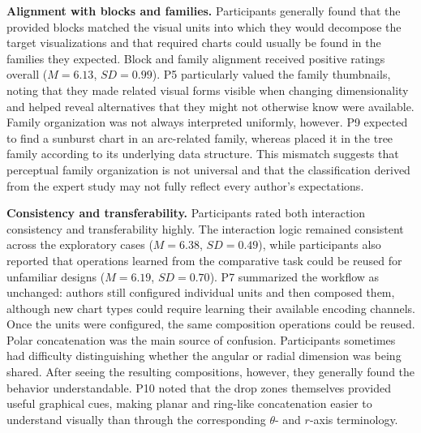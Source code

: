 \textbf{Alignment with blocks and families.}
Participants generally found that the provided blocks matched the visual units
into which they would decompose the target visualizations and that required
charts could usually be found in the families they expected. Block and family
alignment received positive ratings overall ($M=6.13$, $SD=0.99$).
P5 particularly valued the family thumbnails, noting that they made related
visual forms visible when changing dimensionality and helped reveal
alternatives that they might not otherwise know were available. Family
organization was not always interpreted uniformly, however. P9 expected to
find a sunburst chart in an arc-related family, whereas {\system} placed it in
the tree family according to its underlying data structure. This mismatch
suggests that perceptual family organization is not universal and that the
classification derived from the expert study may not fully reflect every
author's expectations.

\textbf{Consistency and transferability.}
Participants rated both interaction consistency and transferability highly.
The interaction logic remained consistent across the exploratory cases
($M=6.38$, $SD=0.49$), while participants also reported that operations
learned from the comparative task could be reused for unfamiliar designs
($M=6.19$, $SD=0.70$).
P7 summarized the workflow as unchanged: authors still configured individual
units and then composed them, although new chart types could require learning
their available encoding channels. Once the units were configured, the same
composition operations could be reused.
Polar concatenation was the main source of confusion. Participants sometimes
had difficulty distinguishing whether the angular or radial dimension was
being shared. After seeing the resulting compositions, however, they generally
found the behavior understandable. P10 noted that the drop zones themselves
provided useful graphical cues, making planar and ring-like concatenation
easier to understand visually than through the corresponding $\theta$- and
$r$-axis terminology.

